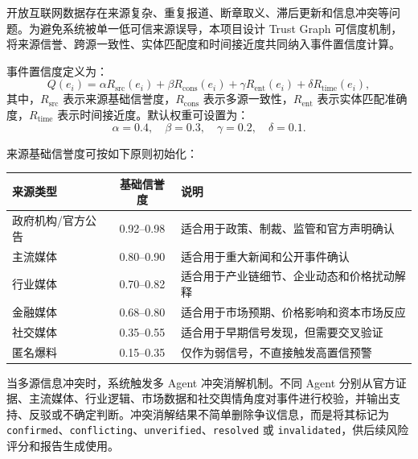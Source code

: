 \documentclass[12pt,a4paper]{article}
\begin{document}
开放互联网数据存在来源复杂、重复报道、断章取义、滞后更新和信息冲突等问题。为避免系统被单一低可信来源误导，本项目设计 Trust Graph 可信度机制，将来源信誉、跨源一致性、实体匹配度和时间接近度共同纳入事件置信度计算。

事件置信度定义为：
\begin{equation}
Q(e_i)=
\alpha R_{\text{src}}(e_i)
+
\beta R_{\text{cons}}(e_i)
+
\gamma R_{\text{ent}}(e_i)
+
\delta R_{\text{time}}(e_i),
\end{equation}
其中，$R_{\text{src}}$ 表示来源基础信誉度，$R_{\text{cons}}$ 表示多源一致性，$R_{\text{ent}}$ 表示实体匹配准确度，$R_{\text{time}}$ 表示时间接近度。默认权重可设置为：
\begin{equation}
\alpha=0.4,\quad \beta=0.3,\quad \gamma=0.2,\quad \delta=0.1.
\end{equation}

来源基础信誉度可按如下原则初始化：
\begin{center}
\begin{tabularx}{0.95\linewidth}{>{\raggedright\arraybackslash}X c >{\raggedright\arraybackslash}X}
\toprule
来源类型 & 基础信誉度 & 说明 \\
\midrule
政府机构/官方公告 & 0.92--0.98 & 适合用于政策、制裁、监管和官方声明确认 \\
主流媒体 & 0.80--0.90 & 适合用于重大新闻和公开事件确认 \\
行业媒体 & 0.70--0.82 & 适合用于产业链细节、企业动态和价格扰动解释 \\
金融媒体 & 0.68--0.80 & 适合用于市场预期、价格影响和资本市场反应 \\
社交媒体 & 0.35--0.55 & 适合用于早期信号发现，但需要交叉验证 \\
匿名爆料 & 0.15--0.35 & 仅作为弱信号，不直接触发高置信预警 \\
\bottomrule
\end{tabularx}
\end{center}

当多源信息冲突时，系统触发多 Agent 冲突消解机制。不同 Agent 分别从官方证据、主流媒体、行业逻辑、市场数据和社交舆情角度对事件进行校验，并输出支持、反驳或不确定判断。冲突消解结果不简单删除争议信息，而是将其标记为 \texttt{confirmed}、\texttt{conflicting}、\texttt{unverified}、\texttt{resolved} 或 \texttt{invalidated}，供后续风险评分和报告生成使用。
\end{document}
